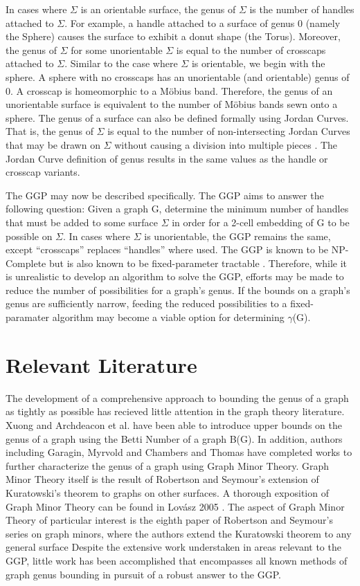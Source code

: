 \documentclass[12pt,conference]{IEEEtran}
\begin{document}
In cases where $\Sigma$ is an orientable surface, the genus of $\Sigma$ is the number of handles attached to $\Sigma$. For example, a handle attached to a surface of genus 0 (namely the Sphere) causes the surface to exhibit a donut shape (the Torus). Moreover, the genus of $\Sigma$ for some unorientable $\Sigma$ is equal to the number of crosscaps attached to $\Sigma$. Similar to the case where $\Sigma$ is orientable, we begin with the sphere. A sphere with no crosscaps has an unorientable (and orientable) genus of 0. A crosscap is homeomorphic to a M\"obius band. Therefore, the genus of an unorientable surface is equivalent to the number of M\"obius bands sewn onto a sphere. The genus of a surface can also be defined formally using Jordan Curves. That is, the genus of $\Sigma$ is equal to the number of non-intersecting Jordan Curves that may be drawn on $\Sigma$ without causing a division into multiple pieces \cite{gao}. The Jordan Curve definition of genus results in the same values as the handle or crosscap variants. 

The GGP may now be described specifically. The GGP aims to answer the following question: Given a graph G, determine the minimum number of handles that must be added to some surface $\Sigma$ in order for a 2-cell embedding of G to be possible on $\Sigma$. In cases where $\Sigma$ is unorientable, the GGP remains the same, except ``crosscaps'' replaces ``handles'' where used. The GGP is known to be NP-Complete \cite{thomassen} but is also known to be fixed-parameter tractable \cite{mohar}. Therefore, while it is unrealistic to develop an algorithm to solve the GGP, efforts may be made to reduce the number of possibilities for a graph's genus. If the bounds on a graph's genus are sufficiently narrow, feeding the reduced possibilities to a fixed-paramater algorithm may become a viable option for determining $\gamma$(G).

\section{Relevant Literature}

The development of a comprehensive approach to bounding the genus of a graph as tightly as possible has recieved little attention in the graph theory literature. Xuong \cite{xuong} and Archdeacon et al. \cite{archdeacon} have been able to introduce upper bounds on the genus of a graph using the Betti Number of a graph B(G). In addition, authors including Garagin, Myrvold and Chambers \cite{gagarin-myrvold} and Thomas \cite{thomas} have completed works to further characterize the genus of a graph using Graph Minor Theory. Graph Minor Theory itself is the result of Robertson and Seymour's extension of Kuratowski's theorem to graphs on other surfaces. A thorough exposition of Graph Minor Theory can be found in Lov\'asz 2005 \cite{lovasz}. The aspect of Graph Minor Theory of particular interest is the eighth paper of Robertson and Seymour's series on graph minors, where the authors extend the Kuratowski theorem to any general surface \cite{graph-minors-8} Despite the extensive work understaken in areas relevant to the GGP, little work has been accomplished that encompasses all known methods of graph genus bounding in pursuit of a robust answer to the GGP. 
\end{document}
